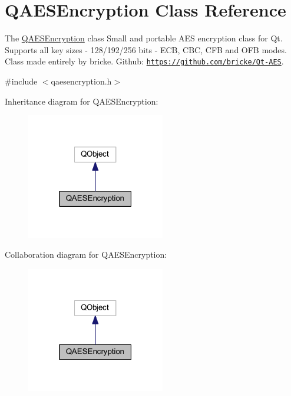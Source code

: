 \hypertarget{class_q_a_e_s_encryption}{}\section{Q\+A\+E\+S\+Encryption Class Reference}
\label{class_q_a_e_s_encryption}


The \mbox{\hyperlink{class_q_a_e_s_encryption}{Q\+A\+E\+S\+Encryption}} class Small and portable A\+ES encryption class for Qt. Supports all key sizes -\/ 128/192/256 bits -\/ E\+CB, C\+BC, C\+FB and O\+FB modes. Class made entirely by bricke. Github\+: \href{https://github.com/bricke/Qt-AES}{\tt https\+://github.\+com/bricke/\+Qt-\/\+A\+ES}.  




{\ttfamily \#include $<$qaesencryption.\+h$>$}



Inheritance diagram for Q\+A\+E\+S\+Encryption\+:
\nopagebreak
\begin{figure}[H]
\begin{center}
\leavevmode
\includegraphics[width=171pt]{class_q_a_e_s_encryption__inherit__graph}
\end{center}
\end{figure}


Collaboration diagram for Q\+A\+E\+S\+Encryption\+:
\nopagebreak
\begin{figure}[H]
\begin{center}
\leavevmode
\includegraphics[width=171pt]{class_q_a_e_s_encryption__coll__graph}
\end{center}
\end{figure}
